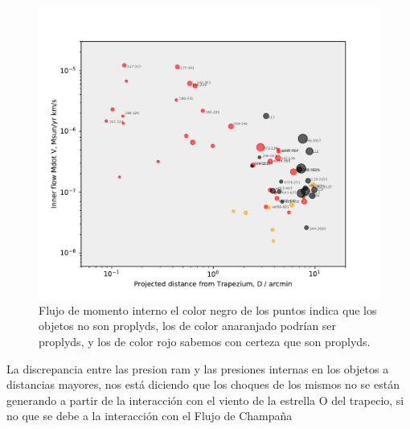 \documentclass{article}
\begin{document}
\begin{figure}
  \centering
  \includegraphics[width=\linewidth, clip]{luis-programas/will-MdotV-vs-D.pdf}
  \caption{Flujo de momento interno el color negro de los puntos indica que los objetos no son proplyds, los de color anaranjado podrían ser proplyds, y los de color rojo sabemos con certeza que son proplyds.}
 \label{fig:flow}
\end{figure}

La discrepancia entre las presion ram y las presiones internas en los objetos a distancias mayores, nos está diciendo que los choques de los mismos no se están generando a partir de la interacción con el viento de la estrella O del trapecio, si no que se debe a la interacción con el Flujo de Champaña
\end{document}
